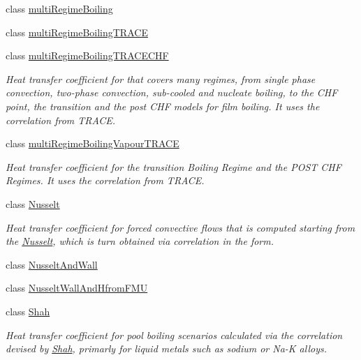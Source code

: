 \begin{DoxyCompactItemize}
class \hyperlink{classFoam_1_1FSHeatTransferCoefficientModels_1_1multiRegimeBoiling}{multi\+Regime\+Boiling}
\item 
class \hyperlink{classFoam_1_1FSHeatTransferCoefficientModels_1_1multiRegimeBoilingTRACE}{multi\+Regime\+Boiling\+T\+R\+A\+CE}
\item 
class \hyperlink{classFoam_1_1FSHeatTransferCoefficientModels_1_1multiRegimeBoilingTRACECHF}{multi\+Regime\+Boiling\+T\+R\+A\+C\+E\+C\+HF}
\begin{DoxyCompactList}\small\item\em Heat transfer coefficient for that covers many regimes, from single phase convection, two-\/phase convection, sub-\/cooled and nucleate boiling, to the C\+HF point, the transition and the post C\+HF models for film boiling. It uses the correlation from T\+R\+A\+CE. \end{DoxyCompactList}\item 
class \hyperlink{classFoam_1_1FSHeatTransferCoefficientModels_1_1multiRegimeBoilingVapourTRACE}{multi\+Regime\+Boiling\+Vapour\+T\+R\+A\+CE}
\begin{DoxyCompactList}\small\item\em Heat transfer coefficient for the transition Boiling Regime and the P\+O\+ST C\+HF Regimes. It uses the correlation from T\+R\+A\+CE. \end{DoxyCompactList}\item 
class \hyperlink{classFoam_1_1FSHeatTransferCoefficientModels_1_1Nusselt}{Nusselt}
\begin{DoxyCompactList}\small\item\em Heat transfer coefficient for forced convective flows that is computed starting from the \hyperlink{classFoam_1_1FSHeatTransferCoefficientModels_1_1Nusselt}{Nusselt}, which is turn obtained via correlation in the form. \end{DoxyCompactList}\item 
class \hyperlink{classFoam_1_1FSHeatTransferCoefficientModels_1_1NusseltAndWall}{Nusselt\+And\+Wall}
\item 
class \hyperlink{classFoam_1_1FSHeatTransferCoefficientModels_1_1NusseltWallAndHfromFMU}{Nusselt\+Wall\+And\+Hfrom\+F\+MU}
\item 
class \hyperlink{classFoam_1_1FSHeatTransferCoefficientModels_1_1Shah}{Shah}
\begin{DoxyCompactList}\small\item\em Heat transfer coefficient for pool boiling scenarios calculated via the correlation devised by \hyperlink{classFoam_1_1FSHeatTransferCoefficientModels_1_1Shah}{Shah}, primarly for liquid metals such as sodium or Na-\/K alloys. \end{DoxyCompactList}\item 

\end{DoxyCompactItemize}
